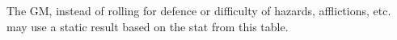 

The GM, instead of rolling for defence or difficulty of hazards, afflictions, etc. may use a static result based on the stat from this table.


